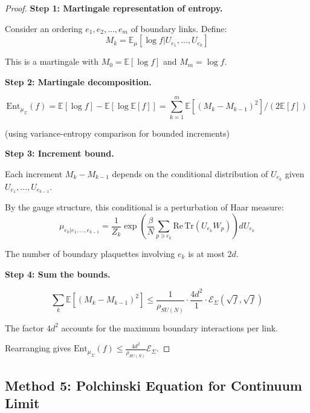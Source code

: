 \begin{proof}
\textbf{Step 1: Martingale representation of entropy.}

Consider an ordering $e_1, e_2, \ldots, e_m$ of boundary links. Define:
\begin{equation}
M_k = \mathbb{E}_\mu[\log f | U_{e_1}, \ldots, U_{e_k}]
\end{equation}

This is a martingale with $M_0 = \mathbb{E}[\log f]$ and $M_m = \log f$.

\textbf{Step 2: Martingale decomposition.}

\begin{equation}
\mathrm{Ent}_{\mu_\Sigma}(f) = \mathbb{E}[\log f] - \mathbb{E}[\log \mathbb{E}[f]] 
= \sum_{k=1}^m \mathbb{E}[(M_k - M_{k-1})^2] / (2 \mathbb{E}[f])
\end{equation}

(using variance-entropy comparison for bounded increments)

\textbf{Step 3: Increment bound.}

Each increment $M_k - M_{k-1}$ depends on the conditional distribution of 
$U_{e_k}$ given $U_{e_1}, \ldots, U_{e_{k-1}}$.

By the gauge structure, this conditional is a perturbation of Haar measure:
\begin{equation}
\mu_{e_k | e_1, \ldots, e_{k-1}} = \frac{1}{Z_k} \exp\left(\frac{\beta}{N} \sum_{p \ni e_k} \mathrm{Re}\,\mathrm{Tr}(U_{e_k} W_p)\right) dU_{e_k}
\end{equation}

The number of boundary plaquettes involving $e_k$ is at most $2d$.

\textbf{Step 4: Sum the bounds.}

\begin{equation}
\sum_k \mathbb{E}[(M_k - M_{k-1})^2] \leq \frac{1}{\rho_{SU(N)}} \cdot 
\frac{4d^2}{1} \cdot \mathcal{E}_\Sigma(\sqrt{f}, \sqrt{f})
\end{equation}

The factor $4d^2$ accounts for the maximum boundary interactions per link.

Rearranging gives $\mathrm{Ent}_{\mu_\Sigma}(f) \leq \frac{4d^2}{\rho_{SU(N)}} \mathcal{E}_\Sigma$.
\end{proof}

\subsection{Method 5: Polchinski Equation for Continuum Limit}
\label{subsec:polchinski-continuum}

